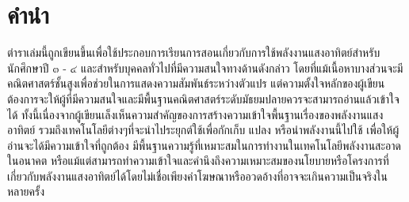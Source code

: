 \message{ !name(solar.tex)}\documentclass[
a4paper,
svgnames,
openany,
justified,
]{tufte-book}
\begin{document}


\frontmatter


\restoregeometry %
\pagecolor{White}%


\chapter*{คำนำ}

ตำราเล่มนี้ถูกเขียนขึ้นเพื่อใช้ประกอบการเรียนการสอนเกี่ยวกับการใช้พลังงานแสงอาทิตย์สำหรับนักศึกษาปี ๓ - ๔ และสำหรับบุคคลทั่วไปที่มีความสนใจทางด้านดังกล่าว โดยที่แม้เนื้อหาบางส่วนจะมีคณิตศาสตร์ชั้นสูงเพื่อช่วยในการแสดงความสัมพันธ์ระหว่างตัวแปร แต่ความตั้งใจหลักของผู้เขียนต้องการจะให้ผู้ที่มีความสนใจและมีพื้นฐานคณิตศาสตร์ระดับมัธยมปลายควรจะสามารถอ่านแล้วเข้าใจได้ ทั้งนี้เนื่องจากผู้เขียนเล็งเห็นความสำคัญของการสร้างความเข้าใจพื้นฐานเรื่องของพลังงานแสงอาทิตย์ รวมถึงเทคโนโลยีต่างๆที่จะนำไประยุกต์ใช้เพื่อกักเก็บ แปลง หรือนำพลังงานนี้ไปใช้ เพื่อให้ผู้อ่านจะได้มีความเข้าใจที่ถูกต้อง มีพื้นฐานความรู้ที่เหมาะสมในการทำงานในเทคโนโลยีพลังงานสะอาดในอนาคต หรือแม้แต่สามารถทำความเข้าใจและคำนึงถึงความเหมาะสมของนโยบายหรือโครงการที่เกี่ยวกับพลังงานแสงอาทิตย์ได้โดยไม่เชื่อเพียงคำโฆษณาหรืออวดอ้างที่อาจจะเกินความเป็นจริงในหลายครั้ง
\end{document}
